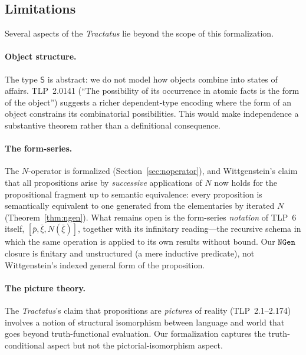 \documentclass[jsl,bibother]{asl}
\theoremstyle{definition}
\theoremstyle{remark}
\newcommand{\Sach}{\mathsf{S}}
\begin{document}
\subsection{Limitations}
\label{sec:limitations}

Several aspects of the \emph{Tractatus} lie beyond the scope of
this formalization.

\paragraph{Object structure.}
The type $\Sach$ is abstract: we do not model how objects combine
into states of affairs.  TLP~2.0141 (``The possibility of its
occurrence in atomic facts is the form of the object'') suggests
a richer dependent-type encoding where the form of an object
constrains its combinatorial possibilities.  This would make
independence a substantive theorem rather than a definitional
consequence.

\paragraph{The form-series.}
The $N$-operator is formalized
(Section~\ref{sec:noperator}), and Wittgenstein's claim that
all propositions arise by \emph{successive} applications of
$N$ now holds for the propositional fragment up to semantic
equivalence: every proposition is semantically equivalent to
one generated from the elementaries by iterated $N$
(Theorem~\ref{thm:ngen}).  What remains open is the
form-series \emph{notation} of TLP~6 itself,
$[\bar{p}, \bar{\xi}, N(\bar{\xi})]$, together with its
infinitary reading---the recursive schema in which the same
operation is applied to its own results without bound.  Our
$\mathtt{NGen}$ closure is finitary and unstructured (a mere
inductive predicate), not Wittgenstein's indexed general form
of the proposition.

\paragraph{The picture theory.}
The \emph{Tractatus}'s claim that propositions are
\emph{pictures} of reality (TLP~2.1--2.174) involves a notion
of structural isomorphism between language and world that goes
beyond truth-functional evaluation.  Our formalization captures
the truth-conditional aspect but not the pictorial-isomorphism
aspect.
\end{document}

